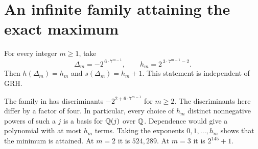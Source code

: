 \section{An infinite family attaining the exact maximum}\label{sec:family}
\begin{theorem}\label{thm:family}
For every integer $m\ge1$, take
\[
 \Delta_m=-2^{\,6\cdot7^{m-1}},\qquad h_m=2^{\,3\cdot7^{m-1}-2}.
\]
Then $h(\Delta_m)=h_m$ and $s(\Delta_m)=h_m+1$. This statement is independent of GRH.
\end{theorem}
The family in \cite{sparseparallel} has discriminants $-2^{2+6\cdot7^{m-1}}$ for $m\ge2$. The discriminants here differ by a factor of four. In particular, every choice of $h_m$ distinct nonnegative powers of such a $j$ is a basis for $\mathbb Q(j)$ over $\mathbb Q$. Dependence would give a polynomial with at most $h_m$ terms. Taking the exponents $0,1,\ldots,h_m$ shows that the minimum is attained. At $m=2$ it is $524{,}289$. At $m=3$ it is $2^{145}+1$.

